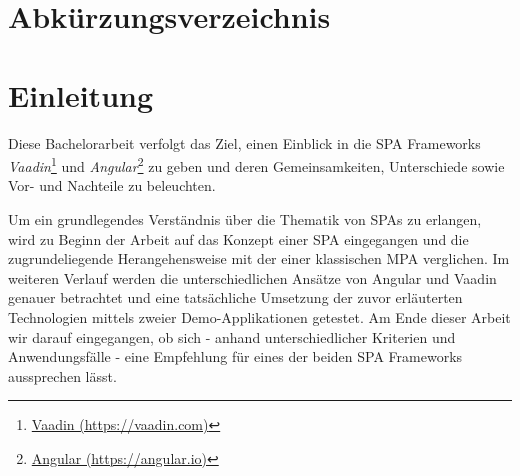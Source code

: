 \documentclass[a4paper,12pt,twoside]{scrreprt}
\begin{document}
\cleardoublepage %
\setcounter{tocdepth}{2}
\tableofcontents

\clearpage
{}
{}
\listoffigures

\clearpage
{}
{}
\chapter*{Abkürzungsverzeichnis}
\begin{acronym}
\end{acronym}

\cleardoublepage
{}
\chapter{Einleitung}
\label{chap:einleitung}
Diese Bachelorarbeit verfolgt das Ziel, einen Einblick in die \ac{SPA} Frameworks \textit{Vaadin}\footnote{\href{https://vaadin.com/}{Vaadin (https://vaadin.com)}} und \textit{Angular}\footnote{\href{https://angular.io/}{Angular (https://angular.io)}} zu geben und deren Gemeinsamkeiten, Unterschiede sowie Vor- und Nachteile zu beleuchten.

\medskip

Um ein grundlegendes Verständnis über die Thematik von \acp{SPA} zu erlangen, wird zu Beginn der Arbeit auf das Konzept einer \ac{SPA} eingegangen und die zugrundeliegende Herangehensweise mit der einer klassischen \ac{MPA} verglichen. Im weiteren Verlauf werden die unterschiedlichen Ansätze von Angular und Vaadin genauer betrachtet und eine tatsächliche Umsetzung der zuvor erläuterten Technologien mittels zweier Demo-Applikationen getestet. Am Ende dieser Arbeit wir darauf eingegangen, ob sich - anhand unterschiedlicher Kriterien und Anwendungsfälle - eine Empfehlung für eines der beiden \ac{SPA} Frameworks aussprechen lässt.
\end{document}

